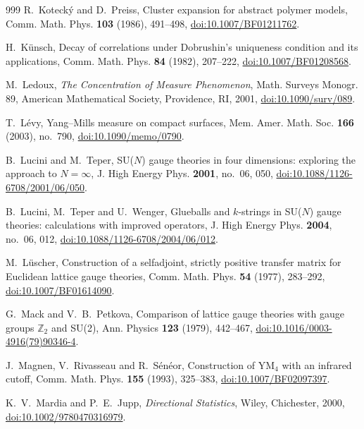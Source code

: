 \documentclass[aps,prd,twocolumn,superscriptaddress,nofootinbib,longbibliography,floatfix,amsmath,amssymb,10pt]{revtex4-2}
\theoremstyle{definition}
\theoremstyle{remark}
\begin{document}
\begin{thebibliography}{999}
R.~Koteck\'y and D.~Preiss, Cluster expansion for abstract polymer models,
Comm. Math. Phys. \textbf{103} (1986), 491--498,
\href{https://doi.org/10.1007/BF01211762}{doi:10.1007/BF01211762}.

H.~K\"unsch, Decay of correlations under Dobrushin's uniqueness condition
and its applications, Comm. Math. Phys. \textbf{84} (1982), 207--222,
\href{https://doi.org/10.1007/BF01208568}{doi:10.1007/BF01208568}.

M.~Ledoux, \emph{The Concentration of Measure Phenomenon}, Math. Surveys
Monogr. 89, American Mathematical Society, Providence, RI, 2001,
\href{https://doi.org/10.1090/surv/089}{doi:10.1090/surv/089}.

T.~L\'evy, Yang--Mills measure on compact surfaces, Mem. Amer. Math. Soc.
\textbf{166} (2003), no.~790,
\href{https://doi.org/10.1090/memo/0790}{doi:10.1090/memo/0790}.

B.~Lucini and M.~Teper, SU($N$) gauge theories in four dimensions: exploring
the approach to $N=\infty$, J. High Energy Phys. \textbf{2001}, no.~06,
050, \href{https://doi.org/10.1088/1126-6708/2001/06/050}{doi:10.1088/1126-6708/2001/06/050}.

B.~Lucini, M.~Teper and U.~Wenger, Glueballs and $k$-strings in SU($N$) gauge
theories: calculations with improved operators, J. High Energy Phys.
\textbf{2004}, no.~06, 012,
\href{https://doi.org/10.1088/1126-6708/2004/06/012}{doi:10.1088/1126-6708/2004/06/012}.

M.~L\"uscher, Construction of a selfadjoint, strictly positive transfer
matrix for Euclidean lattice gauge theories, Comm. Math. Phys. \textbf{54}
(1977), 283--292, \href{https://doi.org/10.1007/BF01614090}{doi:10.1007/BF01614090}.

G.~Mack and V.~B.~Petkova, Comparison of lattice gauge theories with gauge
groups $\mathbb Z_2$ and SU(2), Ann. Physics \textbf{123} (1979), 442--467,
\href{https://doi.org/10.1016/0003-4916(79)90346-4}{doi:10.1016/0003-4916(79)90346-4}.

J.~Magnen, V.~Rivasseau and R.~S\'en\'eor, Construction of YM$_4$ with an
infrared cutoff, Comm. Math. Phys. \textbf{155} (1993), 325--383,
\href{https://doi.org/10.1007/BF02097397}{doi:10.1007/BF02097397}.

K.~V.~Mardia and P.~E.~Jupp, \emph{Directional Statistics}, Wiley,
Chichester, 2000, \href{https://doi.org/10.1002/9780470316979}{doi:10.1002/9780470316979}.


\end{thebibliography}
\end{document}
